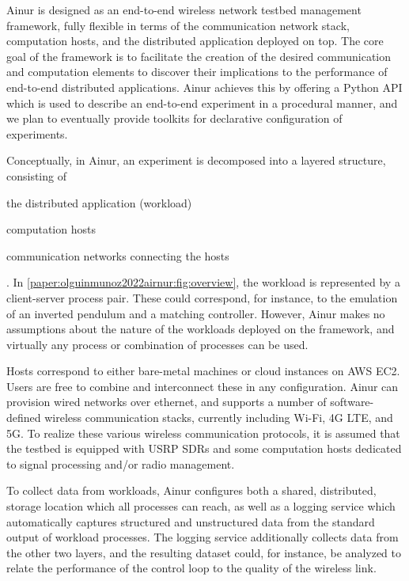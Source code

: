 Ainur is designed as an end-to-end wireless network testbed management framework, fully flexible in terms of the communication network stack, computation hosts, and the distributed application deployed on top.
The core goal of the framework is to facilitate the creation of the desired communication and computation elements to discover their implications to the performance of end-to-end distributed applications.
Ainur achieves this by offering a Python \gls{API} which is used to describe an end-to-end experiment in a procedural manner, and we plan to eventually provide toolkits for declarative configuration of experiments.

Conceptually, in Ainur, an experiment is decomposed into a layered structure, consisting of
\begin{enumerate*}[itemjoin={{; }}, itemjoin*={{; and }}]
    \item the distributed application (workload)
    \item computation hosts
    \item communication networks connecting the hosts
\end{enumerate*}.
In \cref{paper:olguinmunoz2022airnur:fig:overview}, the workload is represented by a client-server process pair.
These could correspond, for instance, to the emulation of an inverted pendulum and a matching controller.
However, Ainur makes no assumptions about the nature of the workloads deployed on the framework, and virtually any process or combination of processes can be used.

Hosts correspond to either bare-metal machines or cloud instances on \gls{AWS} \gls{EC2}.
Users are free to combine and interconnect these in any configuration.
Ainur can provision wired networks over ethernet, and supports a number of software-defined wireless communication stacks, currently including Wi-Fi, 4G \gls{LTE}, and 5G.
To realize these various wireless communication protocols, it is assumed that the testbed is equipped with \gls{USRP} \gls{SDR}s and some computation hosts dedicated to signal processing and/or radio management.

To collect data from workloads, Ainur configures both a shared, distributed, storage location which all processes can reach, as well as a logging service which automatically captures structured and unstructured data from the standard output of workload processes.
The logging service additionally collects data from the other two layers, and the resulting dataset could, for instance, be analyzed to relate the performance of the control loop to the quality of the wireless link. 

